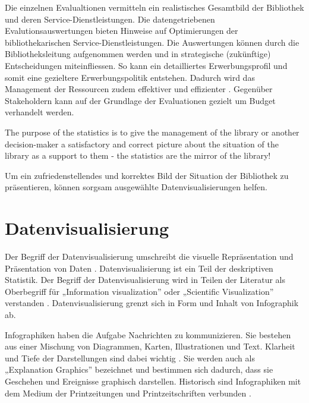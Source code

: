 Die einzelnen Evalualtionen vermitteln ein realistisches Gesamtbild der Bibliothek und deren Service-Dienstleistungen. 
Die datengetriebenen Evalutionsauswertungen bieten Hinweise auf Optimierungen der bibliothekarischen Service-Dienstleistungen. 
Die Auswertungen können durch die Bibliotheksleitung aufgenommen werden und in strategische (zukünftige) Entscheidungen miteinfliessen. 
So kann ein detailliertes Erwerbungsprofil und somit eine gezieltere Erwerbungspolitik entstehen. 
Dadurch wird das Management der Ressourcen zudem effektiver und effizienter \cite[Vgl.][297]{johnson_peggy_fundamentals_2014}.
Gegenüber Stakeholdern kann auf der Grundlage der Evaluationen gezielt um Budget verhandelt werden.
\begin{displayquote}
    The purpose of the statistics is to give the management of the library or another decision-maker 
    a satisfactory and correct picture about the situation of the library as a support to them - the statistics are the mirror of the library!
    \cite[463]{laitinen_markku_library_2013}
\end{displayquote}

Um ein zufriedenstellendes und korrektes Bild der Situation der Bibliothek zu präsentieren, können sorgsam ausgewählte Datenvisualisierungen helfen.




\section{Datenvisualisierung}
Der Begriff der Datenvisualisierung umschreibt die visuelle Repräsentation und Präsentation von Daten \cite[Vgl.][15 ff.]{kirk_data_2019}.
Datenvisualisierung ist ein Teil der deskriptiven Statistik. \cite{cleff_deskriptive_2011}
Der Begriff der Datenvisualisierung wird in Teilen der Literatur als Oberbegriff für „Information visualization” oder „Scientific Visualization” verstanden \cite[Vgl.][11]{few_now_2009}.
Datenvisualisierung grenzt sich in Form und Inhalt von Infographik ab. 

Infographiken haben die Aufgabe Nachrichten zu kommunizieren.
Sie bestehen aus einer Mischung von Diagrammen, Karten, Illustrationen und Text. Klarheit und Tiefe der Darstellungen sind dabei wichtig
\cite[Vgl.][31]{cairo_truthful_2016}. Sie werden auch als „Explanation Graphics”
bezeichnet und bestimmen sich dadurch, dass sie Geschehen und Ereignisse graphisch darstellen. 
Historisch sind Infographiken mit dem Medium der Printzeitungen und Printzeitschriften verbunden \cite[Vgl.][27]{kirk_data_2019}.

